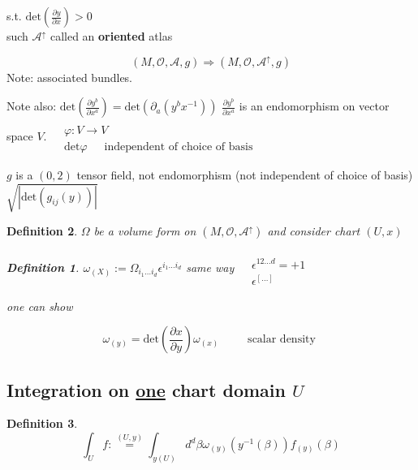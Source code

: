 \documentclass[10pt]{amsart}
\newtheorem{definition}{Definition}
\begin{document}
\begin{multicols*}{2}
	s.t. $\text{det}\left( \frac{ \partial y}{ \partial x} \right) >0$  \\
	\phantom{ \quad \, } such $\mathcal{A}^{\uparrow} $ called an \textbf{oriented} atlas 
	
	\[
	(M, \mathcal{O}, \mathcal{A},g) \Longrightarrow (M,\mathcal{O},\mathcal{A}^{\uparrow} ,g)
	\]
	Note: associated bundles.
	
	Note also:
	$ \text{det}\left( \frac{ \partial y^b}{ \partial x^a} \right) = \text{det}(\partial_a(y^bx^{-1}))$ \phantom{ \quad \quad \, } $\frac{ \partial y^b}{ \partial x^a}$ is an endomorphism on vector space $V$.  $\begin{aligned} & \quad \\ 
	& \varphi : V \to V \\
	& \text{det}\varphi \quad \, \text{ independent of choice of basis } \end{aligned}$
	
	\phantom{\quad \quad \, } $g$ is a $(0,2)$ tensor field, not endomorphism (not independent of choice of basis) $\sqrt{ |\text{det}(g_{ij}(y)) | }$
	
	\begin{definition} $\Omega$ be a volume form on $(M,\mathcal{O}, \mathcal{A}^{\uparrow} )$ and consider chart $(U,x)$ 
		\begin{definition} $\omega_{(X)} := \Omega_{i_1\dots i_d} \epsilon^{i_1\dots i_d}$
			same way $\begin{aligned} & \quad \\ 
			& \epsilon^{12 \dots d} = +1 \\ 
			& \epsilon^{[\dots ]} \end{aligned}$
			
			one can show
			
			\[
			\boxed{ \omega_{(y)} = \text{det}\left( \frac{ \partial x}{ \partial y} \right) \omega_{(x)} } \quad \quad \, \text{ scalar density }
			\]
		\end{definition}
	\end{definition}
	
	\subsection{Integration on \underline{one} chart domain $U$}
	
	\begin{definition}
		\begin{equation}
		\boxed{ \int_U f :\overset{ (U,y) }{=} \int_{y(U)} d^d\beta \omega_{(y)}(y^{-1}(\beta)) f_{(y)}(\beta) }
		\end{equation}
	\end{definition}
	

\end{multicols*}
\end{document}
